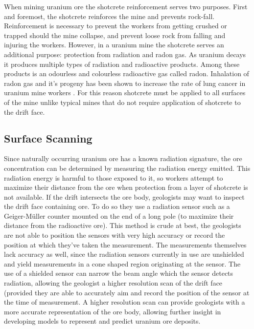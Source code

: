 When mining uranium ore the shotcrete reinforcement serves two purposes. First and foremost, the shotcrete reinforces the mine and prevents rock-fall. Reinforcement is necessary to prevent the workers from getting crushed or trapped should the mine collapse, and prevent loose rock from falling and injuring the workers. However, in a uranium mine the shotcrete serves an additional purpose: protection from radiation and radon gas. As uranium decays it produces multiple types of radiation and radioactive products. Among these products is an odourless and colourless radioactive gas called radon. Inhalation of radon gas and it's progeny has been shown to increase the rate of lung cancer in uranium mine workers \cite{radon}. For this reason shotcrete must be applied to all surfaces of the mine unlike typical mines that do not require application of shotcrete to the drift face.\\

\subsection{Surface Scanning}

Since naturally occurring uranium ore has a known radiation signature, the ore concentration can be determined by measuring the radiation energy emitted. This radiation energy is harmful to those exposed to it, so workers attempt to maximize their distance from the ore when protection from a layer of shotcrete is not available. If the drift intersects the ore body, geologists may want to inspect the drift face containing ore. To do so they use a radiation sensor such as a Geiger-M{\"u}ller counter mounted on the end of a long pole (to maximize their distance from the radioactive ore). This method is crude at best, the geologists are not able to position the sensors with very high accuracy or record the position at which they've taken the measurement. The measurements themselves lack accuracy as well, since the radiation sensors currently in use are unshielded and yield measurements in a cone shaped region originating at the sensor. The use of a shielded sensor can narrow the beam angle which the sensor detects radiation, allowing the geologist a higher resolution scan of the drift face (provided they are able to accurately aim and record the position of the sensor at the time of measurement. A higher resolution scan can provide geologists with a more accurate representation of the ore body, allowing further insight in developing models to represent and predict uranium ore deposits.\\


